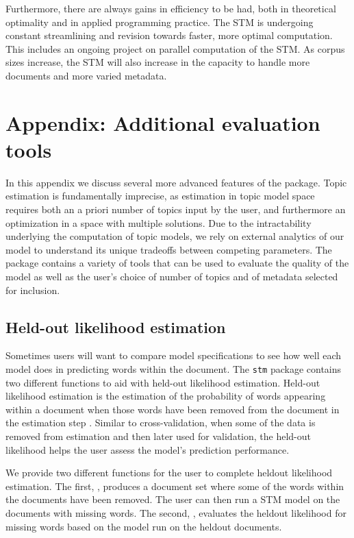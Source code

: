 \documentclass[article,shortnames]{jss}
\begin{document}
Furthermore, there are always gains in efficiency to be had, both in theoretical optimality and in applied programming practice.  The STM is undergoing constant streamlining and revision towards faster, more optimal computation. This includes an ongoing project on parallel computation of the STM. As corpus sizes increase, the STM will also increase in the capacity to handle more documents and more varied metadata.


\section{Appendix: Additional evaluation tools}
\label{sec:eval}

In this appendix we discuss several more advanced features of the  package. Topic estimation is fundamentally imprecise, as estimation in topic model space requires both an a priori number of topics input by the user, and furthermore an optimization in a space with multiple solutions. Due to the intractability underlying the computation of topic models, we rely on external analytics of our model to understand its unique tradeoffs between competing parameters.  The  package contains a variety of tools that can be used to evaluate the quality of the model as well as the user's choice of number of topics and of metadata selected for inclusion.


\subsection{Held-out likelihood estimation}
Sometimes users will want to compare model specifications to see how well each model does in predicting words within the document.  The \texttt{stm} package contains two different functions to aid with held-out likelihood estimation.  Held-out likelihood estimation is the estimation of the probability of words appearing within a document when those words have been removed from the document in the estimation step \citep{blei2003latent}.  Similar to cross-validation, when some of the data is removed from estimation and then later used for validation, the held-out likelihood helps the user assess the model's prediction performance.

We provide two different functions for the user to complete heldout likelihood estimation.  The first,  , produces a document set where some of the words within the documents have been removed.  The user can then run a STM model on the documents with missing words.  The second, , evaluates the heldout likelihood for missing words based on the model run on the heldout documents.
\end{document}

